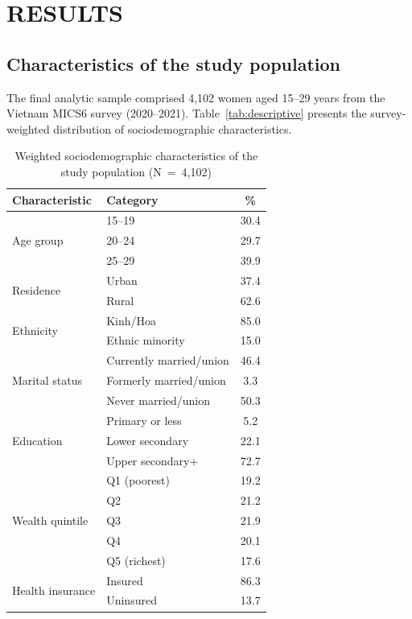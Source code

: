 \chapter{RESULTS}

\section{Characteristics of the study population}

The final analytic sample comprised 4,102 women aged 15--29 years from the Vietnam MICS6 survey (2020--2021). Table~\ref{tab:descriptive} presents the survey-weighted distribution of sociodemographic characteristics.

\begin{table}[htbp]
\caption{Weighted sociodemographic characteristics of the study population (N~=~4,102)}
\centering
\small
\begin{tabular}{|p{4.5cm}|p{4.0cm}|c|}
\hline
\textbf{Characteristic} & \textbf{Category} & \textbf{\%} \\
\hline
\multirow{3}{*}{Age group} & 15--19 & 30.4 \\
 & 20--24 & 29.7 \\
 & 25--29 & 39.9 \\
\hline
\multirow{2}{*}{Residence} & Urban & 37.4 \\
 & Rural & 62.6 \\
\hline
\multirow{2}{*}{Ethnicity} & Kinh/Hoa & 85.0 \\
 & Ethnic minority & 15.0 \\
\hline
\multirow{3}{*}{Marital status} & Currently married/union & 46.4 \\
 & Formerly married/union & 3.3 \\
 & Never married/union & 50.3 \\
\hline
\multirow{3}{*}{Education} & Primary or less & 5.2 \\
 & Lower secondary & 22.1 \\
 & Upper secondary+ & 72.7 \\
\hline
\multirow{5}{*}{Wealth quintile} & Q1 (poorest) & 19.2 \\
 & Q2 & 21.2 \\
 & Q3 & 21.9 \\
 & Q4 & 20.1 \\
 & Q5 (richest) & 17.6 \\
\hline
\multirow{2}{*}{Health insurance} & Insured & 86.3 \\
 & Uninsured & 13.7 \\

\end{tabular}
\end{table}
